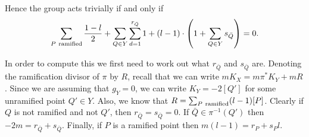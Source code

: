 \documentclass[11pt]{article} %
\theoremstyle{remark}\newtheorem*{rem}{Remark}
\begin{document}
 Hence the group acts trivially if and only if
\[
 \sum_{P\ {\rm ramified}} \frac{1-l}{2} + \sum_{Q\in Y}\sum_{d=1}^{r_{\bar Q}} 1 + (l-1)\cdot \left( 1 + \sum_{Q\in Y} s_{\bar Q} \right) = 0.
\]

In order to compute this we first need to work out what $r_{\bar Q}$ and $s_{\bar Q}$ are.
Denoting the ramification divisor of $\pi$ by $R$, recall that we can write $mK_X = m \pi^* K_Y + mR$.
Since we are assuming that $g_Y=0$, we can write $K_Y=-2[Q']$ for some unramified point $Q'\in Y$.
Also, we know that $R=\sum_{P\ {\rm ramified}} (l-1)[P]$.
Clearly if $Q$ is not ramified and not $Q'$, then $r_{\bar Q}=s_{\bar Q}=0$.
If $\bar Q \in \pi^{-1}(Q')$ then $-2m = r_{\bar Q} + s_{\bar Q}$.
Finally, if $P$ is a ramified point then $m(l-1)=r_P + s_Pl$.





\end{document}
